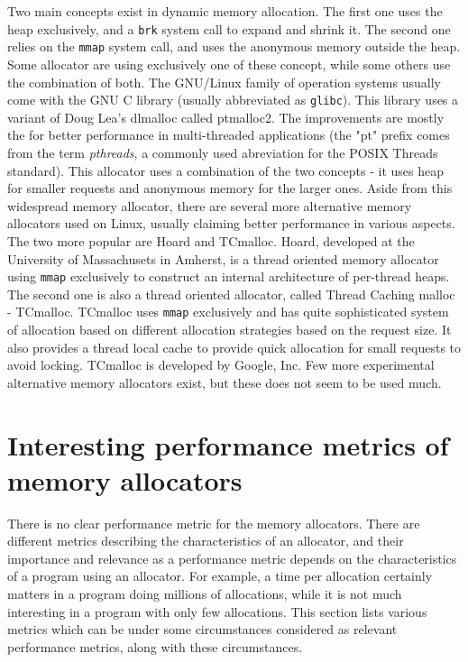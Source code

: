 Two main concepts exist in dynamic memory allocation. The first one uses the heap exclusively, and a {\tt brk} system call to expand and shrink it. The second one relies on the {\tt mmap} system call, and uses the anonymous memory outside the heap. Some allocator are using exclusively one of these concept, while some others use the combination of both. The GNU/Linux family of operation systems usually come with the GNU C library (usually abbreviated as {\tt glibc}). This library uses a variant of Doug Lea's dlmalloc called ptmalloc2. The improvements are mostly the for better performance in multi-threaded applications (the "pt" prefix comes from the term {\em pthreads}, a commonly used abreviation for the POSIX Threads standard). This allocator uses a combination of the two concepts - it uses heap for smaller requests and anonymous memory for the larger ones. Aside from this widespread memory allocator, there are several more alternative memory allocators used on Linux, usually claiming better performance in various aspects. The two more popular are Hoard and TCmalloc. Hoard, developed at the University of Massachusets in Amherst, is a thread oriented memory allocator using {\tt mmap} exclusively to construct an internal architecture of per-thread heaps.\cite{allocators:hoard} The second one is also a thread oriented allocator, called Thread Caching malloc - TCmalloc. TCmalloc uses {\tt mmap} exclusively and has quite sophisticated system of allocation based on different allocation strategies based on the request size. It also provides a thread local cache to provide quick allocation for small requests to avoid locking.\cite{tcmalloc} TCmalloc is developed by Google, Inc. Few more experimental alternative memory allocators exist, but these does not seem to be used much.

\section{Interesting performance metrics of memory allocators}
\label{metrics}

There is no clear performance metric for the memory allocators. There are different metrics describing the characteristics of an allocator, and their importance and relevance as a performance metric depends on the characteristics of a program using an allocator. For example, a time per allocation certainly matters in a program doing millions of allocations, while it is not much interesting in a program with only few allocations. This section lists various metrics which can be under some circumstances considered as relevant performance metrics, along with these circumstances.

